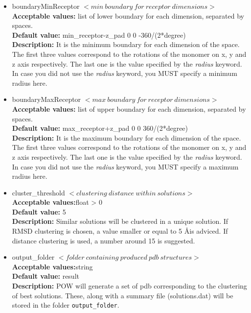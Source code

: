 \documentclass[a4paper, 12pt]{article}
\begin{document}
\begin{itemize}
\item boundaryMinReceptor $< min\ boundary\ for\ receptor\ dimensions >$\\
\textbf{Acceptable values:} list of lower boundary for each dimension, separated by spaces.\\
\textbf{Default value:} min\_receptor-z\_pad 0 0 -360/(2*degree)\\
\textbf{Description:} It is the minimum boundary for each dimension of the space. The first three values correspond to the rotations of the monomer on x, y and z axis respectively. The last one is the value specified by the \emph{radius} keyword. In case you did not use the \emph{radius} keyword, you MUST specify a minimum radius here.

\item boundaryMaxReceptor $< max\ boundary\ for\ receptor\ dimensions >$\\
\textbf{Acceptable values:} list of upper boundary for each dimension, separated by spaces.\\
\textbf{Default value:} max\_receptor+z\_pad 0 0 360/(2*degree)\\
\textbf{Description:} It is the maximum boundary for each dimension of the space. The first three values correspond to the rotations of the monomer on x, y and z axis respectively. The last one is the value specified by the \emph{radius} keyword. In case you did not use the \emph{radius} keyword, you MUST specify a maximum radius here.

\item cluster\_threshold $< clustering\ distance\ within\ solutions >$\\
\textbf{Acceptable values:}float > 0\\
\textbf{Default value:} 5\\
\textbf{Description:} Similar solutions will be clustered in a unique solution. If RMSD clustering is chosen, a value smaller or equal to 5 \AA is adviced. If distance clustering is used, a number around 15 is suggested.

\item output\_folder $< folder\ containing\ produced\ pdb\ structures >$\\
\textbf{Acceptable values:}string\\
\textbf{Default value:} result\\
\textbf{Description:} POW will generate a set of pdb corresponding to the clustering of best solutions. These, along with a summary file (solutions.dat) will be stored in the folder \texttt{output\_folder}.


\end{itemize}
\end{document}
